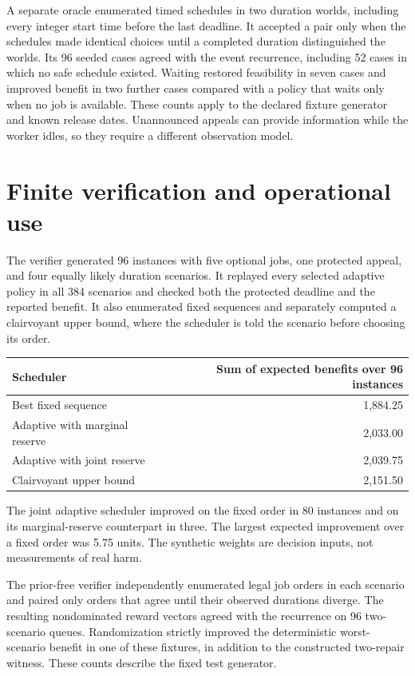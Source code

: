 \documentclass[11pt]{article}
\begin{document}
A separate oracle enumerated timed schedules in two duration
worlds, including every integer start time before the last deadline.
It accepted a pair only when the schedules made identical choices
until a completed duration distinguished the worlds. Its 96 seeded
cases agreed with the event recurrence, including 52 cases in which
no safe schedule existed. Waiting restored feasibility in seven
cases and improved benefit in two further cases compared with a
policy that waits only when no job is available. These counts
apply to the declared fixture generator and known release dates.
Unannounced appeals can provide information while the worker idles,
so they require a different observation model.

\section{Finite verification and operational use}
The verifier generated 96 instances with five optional jobs,
one protected appeal, and four equally likely duration scenarios.
It replayed every selected adaptive policy in all 384 scenarios
and checked both the protected deadline and the reported benefit.
It also enumerated fixed sequences and separately computed a
clairvoyant upper bound, where the scheduler is told the scenario
before choosing its order.
\begin{center}
\begin{tabular}{lr}
\toprule
Scheduler & Sum of expected benefits over 96 instances \\
\midrule
Best fixed sequence & 1,884.25 \\
Adaptive with marginal reserve & 2,033.00 \\
Adaptive with joint reserve & 2,039.75 \\
Clairvoyant upper bound & 2,151.50 \\
\bottomrule
\end{tabular}
\end{center}
The joint adaptive scheduler improved on the fixed order in 80
instances and on its marginal-reserve counterpart in three.
The largest expected improvement over a fixed order was 5.75
units. The synthetic weights are decision inputs, not measurements
of real harm.

The prior-free verifier independently enumerated legal job orders
in each scenario and paired only orders that agree until their
observed durations diverge. The resulting nondominated reward
vectors agreed with the recurrence on 96 two-scenario queues.
Randomization strictly improved the deterministic worst-scenario
benefit in one of these fixtures, in addition to the constructed
two-repair witness. These counts describe the fixed test generator.
\end{document}
